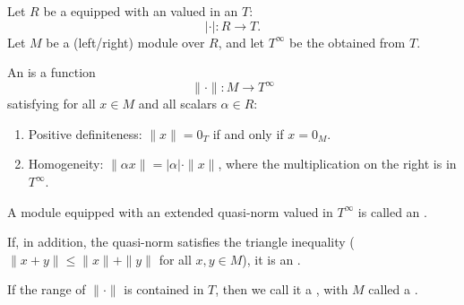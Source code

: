 \begin{definition} \label{definition:extended_quasinorm_on_a_module_over_a_commutative_ring_with_absolute_value}
    Let $R$ be a  equipped with an  valued in an  $T$:
    $$|\cdot| : R \to T.$$
    Let $M$ be a (left/right) module over $R$, and let $T^\infty$ be the  obtained from $T$.

    An  is a function
    $$\|\cdot\| : M \to T^\infty$$
    satisfying for all $x \in M$ and all scalars $\alpha \in R$:
    \begin{enumerate}
        \item Positive definiteness: $\|x\| = 0_T$ if and only if $x = 0_M$.
        \item Homogeneity: $\|\alpha x\| = |\alpha| \cdot \|x\|$, where the multiplication on the right is in $T^\infty$.
    \end{enumerate}
    A module equipped with an extended quasi-norm valued in $T^\infty$ is called an .

    If, in addition, the quasi-norm satisfies the triangle inequality ($\|x + y\| \leq \|x\| + \|y\|$ for all $x, y \in M$), it is an .

    If the range of $\|\cdot\|$ is contained in $T$, then we call it a , with $M$ called a .
\end{definition}
